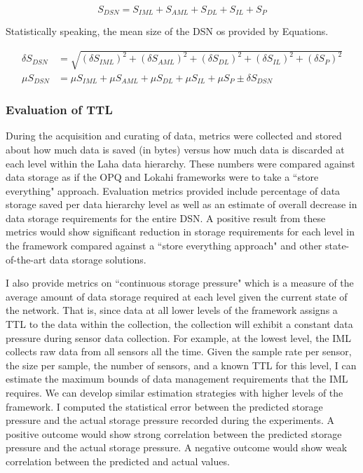 \begin{equation}
	S_{DSN} = S_{IML} + S_{AML} + S_{DL} + S_{IL} + S_{P}
\end{equation}

Statistically speaking, the mean size of the DSN os provided by Equations.

\begin{align}
	\delta S_{DSN} &= \sqrt{(\delta S_{IML})^2 + (\delta S_{AML})^2 + (\delta S_{DL})^2 + (\delta S_{IL})^2 + (\delta S_{P})^2} \\
	\mu S_{DSN} &= \mu S_{IML} + \mu S_{AML} + \mu S_{DL} + \mu S_{IL} + \mu S_{P} \pm \delta S_{DSN}
\end{align}

\subsubsection{Evaluation of TTL}

During the acquisition and curating of data, metrics were collected and stored about how much data is saved (in bytes) versus how much data is discarded at each level within the Laha data hierarchy. These numbers were compared against data storage as if the OPQ and Lokahi frameworks were to take a ``store everything" approach. Evaluation metrics provided include percentage of data storage saved per data hierarchy level as well as an estimate of overall decrease in data storage requirements for the entire DSN. A positive result from these metrics would show significant reduction in storage requirements for each level in the framework compared against a ``store everything approach" and other state-of-the-art data storage solutions.

I also provide metrics on ``continuous storage pressure" which is a measure of the average amount of data storage required at each level given the current state of the network. That is, since data at all lower levels of the framework assigns a TTL to the data within the collection, the collection will exhibit a constant data pressure during sensor data collection. For example, at the lowest level, the IML collects raw data from all sensors all the time. Given the sample rate per sensor, the size per sample, the number of sensors, and a known TTL for this level, I can estimate the maximum bounds of data management requirements that the IML requires. We can develop similar estimation strategies with higher levels of the framework. I computed the statistical error between the predicted storage pressure and the actual storage pressure recorded during the experiments. A positive outcome would show strong correlation between the predicted storage pressure and the actual storage pressure. A negative outcome would show weak correlation between the predicted and actual values.

